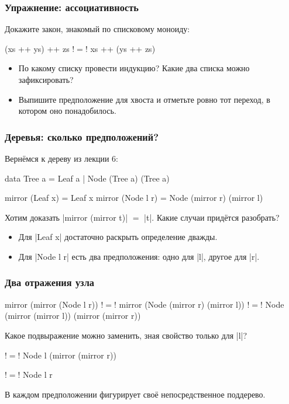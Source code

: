 \documentclass[11pt]{beamer}
\begin{document}
\begin{frame}[fragile]
  \frametitle{Упражнение: ассоциативность}
  Докажите закон, знакомый по списковому моноиду:
  \begin{haskell}
    (xs ++ ys) ++ zs !$=$! xs ++ (ys ++ zs)
  \end{haskell}
  \begin{itemize}
    \item По какому списку провести индукцию? Какие два списка можно зафиксировать?
    \item Выпишите предположение для хвоста и отметьте ровно тот переход, в котором оно понадобилось.
  \end{itemize}
\end{frame}

\begin{frame}[fragile]
  \frametitle{Деревья: сколько предположений?}
  Вернёмся к дереву из лекции 6:
  \begin{haskell}
    data Tree a = Leaf a | Node (Tree a) (Tree a)

    mirror (Leaf x)   = Leaf x
    mirror (Node l r) = Node (mirror r) (mirror l)
  \end{haskell}
  Хотим доказать \haskinline|mirror (mirror t)| $=$ \haskinline|t|. Какие случаи придётся разобрать? \pause
  \begin{itemize}
    \item Для \haskinline|Leaf x| достаточно раскрыть определение дважды.
    \item Для \haskinline|Node l r| есть два предположения: одно для \haskinline|l|, другое для \haskinline|r|.
  \end{itemize}
\end{frame}

\begin{frame}[fragile]
  \frametitle{Два отражения узла}
  \begin{haskell}
      mirror (mirror (Node l r))
    !$=$! mirror (Node (mirror r) (mirror l))
    !$=$! Node (mirror (mirror l)) (mirror (mirror r))
  \end{haskell}
  Какое подвыражение можно заменить, зная свойство только для \haskinline|l|? \pause
  \begin{haskell}
    !$=$! Node l (mirror (mirror r))
  \end{haskell}
  \pause
  \begin{haskell}
    !$=$! Node l r
  \end{haskell}
  В каждом предположении фигурирует своё непосредственное поддерево.
\end{frame}
\end{document}
